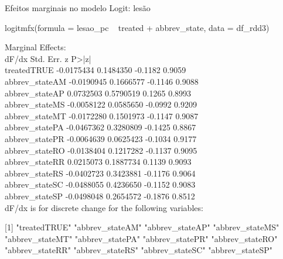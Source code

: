 \documentclass{beamer}
\begin{document}
\begin{frame}{Efeitos marginais no modelo Logit: lesão}
	\begin{tiny}
logitmfx(formula = lesao_pc ~ treated + abbrev_state, data = df_rdd3)

Marginal Effects:\\
dF/dx  Std. Err.       z  P>|z|\\
treatedTRUE    -0.0175434  0.1484350 -0.1182 0.9059\\
abbrev_stateAM -0.0190945  0.1666577 -0.1146 0.9088\\
abbrev_stateAP  0.0732503  0.5790519  0.1265 0.8993\\
abbrev_stateMS -0.0058122  0.0585650 -0.0992 0.9209\\
abbrev_stateMT -0.0172280  0.1501973 -0.1147 0.9087\\
abbrev_statePA -0.0467362  0.3280809 -0.1425 0.8867\\
abbrev_statePR -0.0064639  0.0625423 -0.1034 0.9177\\
abbrev_stateRO -0.0138404  0.1217282 -0.1137 0.9095\\
abbrev_stateRR  0.0215073  0.1887734  0.1139 0.9093\\
abbrev_stateRS -0.0402723  0.3423881 -0.1176 0.9064\\
abbrev_stateSC -0.0488055  0.4236650 -0.1152 0.9083\\
abbrev_stateSP -0.0498048  0.2654572 -0.1876 0.8512\\

dF/dx is for discrete change for the following variables:

[1] "treatedTRUE"    "abbrev_stateAM" "abbrev_stateAP" "abbrev_stateMS"\\
[5] "abbrev_stateMT" "abbrev_statePA" "abbrev_statePR" "abbrev_stateRO"\\
[9] "abbrev_stateRR" "abbrev_stateRS" "abbrev_stateSC" "abbrev_stateSP"\\
\end{tiny}
\\\end{frame}
\end{document}
